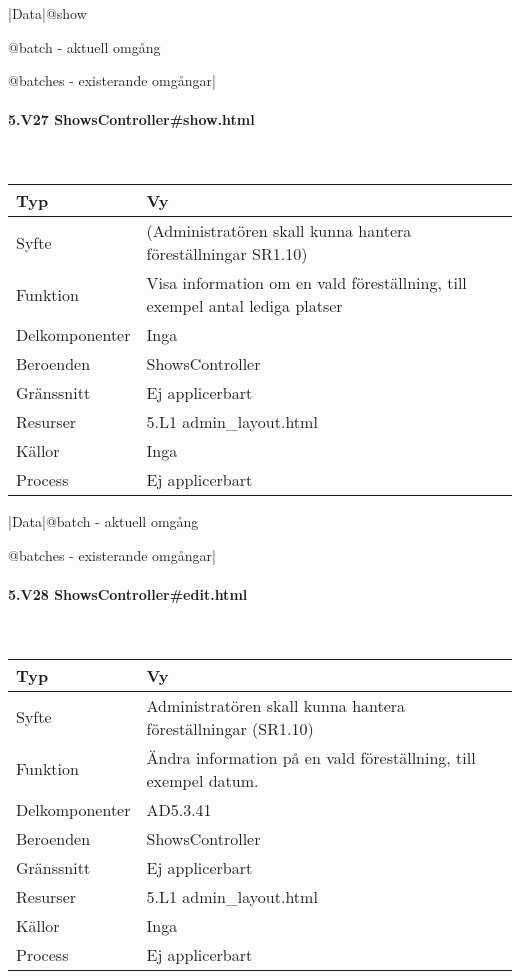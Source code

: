 \documentclass[a4paper, twoside, 11pt, titlepage]{article}
\begin{document}
			|Data|@show

			@batch - aktuell omgång

			@batches - existerande omgångar|

			\paragraph{5.V27 ShowsController\#show.html}\

			\begin {table} [ht] \begin{tabular} {  p{3.5cm} p{9.6cm} }
				\hline
				Typ & Vy  \\
				\hline
				Syfte & (Administratören skall kunna hantera föreställningar SR1.10)  \\
				\hline
				Funktion & Visa information om en vald föreställning, till exempel antal lediga platser  \\
				\hline
				Delkomponenter & Inga  \\
				\hline
				Beroenden & ShowsController  \\
				\hline
				Gränssnitt & Ej applicerbart  \\
				\hline
				Resurser & 5.L1 admin\_layout.html  \\
				\hline
				Källor & Inga  \\
				\hline
				Process & Ej applicerbart  \\
				\hline
			\end{tabular} \end{table} \FloatBarrier
			\vspace{6mm}

			|Data|@batch - aktuell omgång

			@batches - existerande omgångar|

			\paragraph{5.V28 ShowsController\#edit.html}\

			\begin {table} [ht] \begin{tabular} {  p{3.5cm} p{9.6cm} }
				\hline
				Typ & Vy  \\
				\hline
				Syfte & Administratören skall kunna hantera föreställningar (SR1.10)  \\
				\hline
				Funktion & Ändra information på en vald föreställning, till exempel datum.  \\
				\hline
				Delkomponenter & AD5.3.41  \\
				\hline
				Beroenden & ShowsController  \\
				\hline
				Gränssnitt & Ej applicerbart  \\
				\hline
				Resurser & 5.L1 admin\_layout.html  \\
				\hline
				Källor & Inga  \\
				\hline
				Process & Ej applicerbart  \\
				\hline
			\end{tabular} \end{table} \FloatBarrier
			\vspace{6mm}
\end{document}
